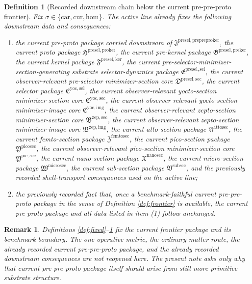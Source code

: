 \documentclass[11pt]{article}
\newcommand{\Car}{\mathrm{car}}
\newcommand{\Cur}{\mathrm{cur}}
\newcommand{\Hom}{\mathrm{hom}}
\newcommand{\PrePreProtoKernelPackage}{\mathfrak J^{\mathrm{presel,prepreproker}}}
\newcommand{\ProtoKernelPackage}{\mathfrak H^{\mathrm{presel,proker}}}
\newcommand{\PreKernelPackage}{\mathfrak G^{\mathrm{presel,preker}}}
\newcommand{\KernelPackage}{\mathfrak F^{\mathrm{presel,ker}}}
\newcommand{\PreSectionSelectorPackage}{\mathfrak E^{\mathrm{presel,sel}}}
\newcommand{\PreSelectorMinSectionCore}{\mathfrak D^{\mathrm{presel,sec}}}
\newcommand{\YoctoSelectorPackage}{\mathfrak C^{\mathrm{yoc,sel}}}
\newcommand{\YoctoImageCore}{\mathfrak C^{\mathrm{yoc,img}}}
\newcommand{\YoctoMinSectionCore}{\mathfrak C^{\mathrm{yoc,sec}}}
\newcommand{\ZeptoImageCore}{\mathfrak B^{\mathrm{zep,img}}}
\newcommand{\ZeptoMinSectionCore}{\mathfrak B^{\mathrm{zep,sec}}}
\newcommand{\AttoSectionPackage}{\mathfrak A^{\mathrm{attosec}}}
\newcommand{\FemtoSectionPackage}{\mathfrak Z^{\mathrm{femtosec}}}
\newcommand{\PicoSectionPackage}{\mathfrak Y^{\mathrm{picosec}}}
\newcommand{\PicoMinSectionCore}{\mathfrak Y^{\mathrm{pic,sec}}}
\newcommand{\NanoSectionPackage}{\mathfrak X^{\mathrm{nanosec}}}
\newcommand{\MicroSectionPackage}{\mathfrak W^{\mathrm{microsec}}}
\newcommand{\SubSectionPackage}{\mathfrak V^{\mathrm{subsec}}}
\newtheorem{definition}{Definition}
\newtheorem{remark}{Remark}
\begin{document}
\begin{definition}[Recorded downstream chain below the current pre-pre-proto frontier]
\label{def:downstream}
Fix \(\sigma\in\{\Car,\Cur,\Hom\}\). The active line already fixes the following downstream data and consequences:
\begin{enumerate}
    \item the current pre-proto package carried downstream of \(\PrePreProtoKernelPackage\), the current proto package \(\ProtoKernelPackage\), the current pre-kernel package \(\PreKernelPackage\), the current kernel package \(\KernelPackage\), the current pre-selector-minimizer-section-generating substrate selector-dynamics package \(\PreSectionSelectorPackage\), the current observer-relevant pre-selector minimizer-section core \(\PreSelectorMinSectionCore\), the current selector package \(\YoctoSelectorPackage\), the current observer-relevant yocto-section minimizer-section core \(\YoctoMinSectionCore\), the current observer-relevant yocto-section minimizer-image core \(\YoctoImageCore\), the current observer-relevant zepto-section minimizer-section core \(\ZeptoMinSectionCore\), the current observer-relevant zepto-section minimizer-image core \(\ZeptoImageCore\), the current atto-section package \(\AttoSectionPackage\), the current femto-section package \(\FemtoSectionPackage\), the current pico-section package \(\PicoSectionPackage\), the current observer-relevant pico-section minimizer-section core \(\PicoMinSectionCore\), the current nano-section package \(\NanoSectionPackage\), the current micro-section package \(\MicroSectionPackage\), the current sub-section package \(\SubSectionPackage\), and the previously recorded shell-transport consequences used on the active line;
    \item the previously recorded fact that, once a benchmark-faithful current pre-pre-proto package in the sense of Definition \ref{def:frontier} is available, the current pre-proto package and all data listed in item (1) follow unchanged.
\end{enumerate}
\end{definition}

\begin{remark}
Definitions \ref{def:fixed}--\ref{def:downstream} fix the current frontier package and its benchmark boundary. The one operative metric, the ordinary matter route, the already recorded current pre-pre-proto package, and the already recorded downstream consequences are not reopened here. The present note asks only why that current pre-pre-proto package itself should arise from still more primitive substrate structure.
\end{remark}
\end{document}
